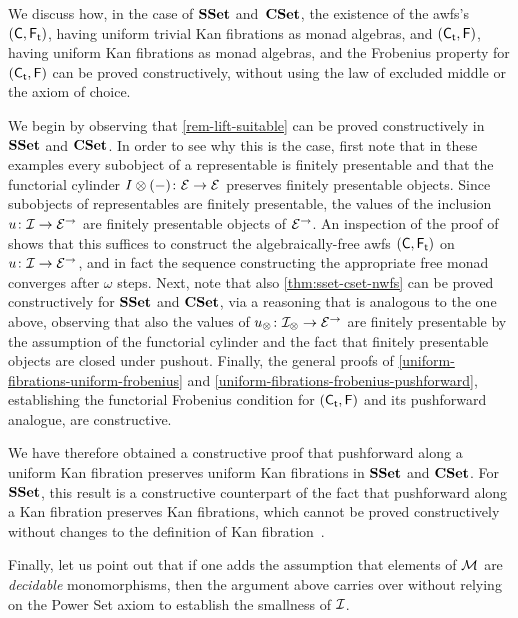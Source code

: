 \documentclass[reqno,10pt,a4paper,oneside,draft]{amsart}
\begin{document}
{{\begin{remark} \label{rem:constructive-small-object}
We discuss how, in the case of $\SSet$ and~$\CSet$, the existence of the awfs's $(\CC, \TF)$, having uniform trivial Kan fibrations as monad algebras, and $(\TC, \FF)$, having uniform Kan fibrations as monad algebras, and the Frobenius property for $(\TC, \FF)$ can be proved constructively, \ie without using the law of excluded middle or the axiom of choice.

We begin by observing that \cref{rem-lift-suitable} can be proved constructively in $\SSet$ and $\CSet$.
In order to see why this is the case, first note that in these examples every subobject of a representable is finitely presentable and that the functorial cylinder $\interval \otimes (-) \co \cal{E} \to \cal{E}$ preserves finitely presentable objects.
Since subobjects of representables are finitely presentable, the values of the inclusion $u \co \cal{I} \to \cal{E}^\to$ are finitely presentable objects of $\cal{E}^\to$.
An inspection of the proof of \cite[Theorem~4.4]{garner:small-object-argument} shows that this suffices to construct the algebraically-free awfs $(\CC, \TF)$ on $u \co \cal{I} \to \cal{E}^\to$, and in fact the sequence constructing the appropriate free monad converges after $\omega$ steps.
Next, note that also \cref{thm:sset-cset-nwfs} can be proved constructively for $\SSet$ and $\CSet$, via a reasoning that is analogous to the one above, observing that also the values of $u_\otimes \co \cal{I}_\otimes \to \cal{E}^\to$ are finitely presentable by the assumption of the functorial cylinder and the fact that finitely presentable objects are closed under pushout.
Finally, the general proofs of \cref{uniform-fibrations-uniform-frobenius} and \cref{uniform-fibrations-frobenius-pushforward}, establishing the functorial Frobenius condition for $(\TC, \FF)$ and its pushforward analogue, are constructive.

We have therefore obtained a constructive proof that pushforward along a uniform Kan fibration preserves uniform Kan fibrations in $\SSet$ and $\CSet$.
For $\SSet$, this result is a constructive counterpart of the fact that pushforward along a Kan fibration preserves Kan fibrations, which cannot be proved constructively without changes to the definition of Kan fibration~\cite{coquand-non-constructivity-kan}.

Finally, let us point out that if one adds the assumption that elements of $\cal{M}$ are \emph{decidable} monomorphisms, then the argument above carries over without relying on the Power Set axiom to establish the smallness of $\cal{I}$.
\end{remark}

}}
\end{document}
